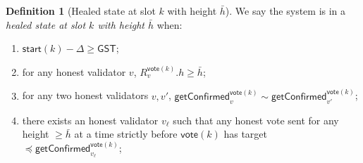 \documentclass{article}
\newcommand{\start}{\mathsf{start}}
\newcommand{\vote}{\mathsf{vote}}
\newcommand{\comm}[1]{\bar{#1}}
\newcommand{\getConfirmed}{\textsf{getConfirmed}\xspace}
\theoremstyle{plain}
\theoremstyle{definition}
\newtheorem{definition}{Definition}
\theoremstyle{remark}
\newcommand{\GST}{\ensuremath{\mathsf{GST}}}
\begin{document}
\begin{definition}[Healed state at slot $k$ with height $\comm{h}$]\label{rev:def:healed-state}
We say the system is in a \emph{healed state at slot $k$ with height $\comm{h}$} when:
\begin{enumerate}
  \item\label{rev:def:healed-state:sync} $\start(k) - \Delta \geq \GST$;
  \item\label{rev:def:healed-state:R} for any honest validator $v$, $R_v^{\vote(k)}.h \geq \comm{h}$;
  \item\label{rev:def:healed-state:gt-compat} for any two honest validators $v, v'$, $\getConfirmed_v^{\vote(k)} \sim \getConfirmed_{v'}^{\vote(k)}$;
  \item\label{rev:def:healed-state:target-cap} there exists an honest validator $v_\ell$ such that any honest vote sent for any height $\geq \comm{h}$ at a time strictly before $\vote(k)$ has target $\preceq \getConfirmed_{v_\ell}^{\vote(k)}$;
\end{enumerate}
\end{definition}
\end{document}
